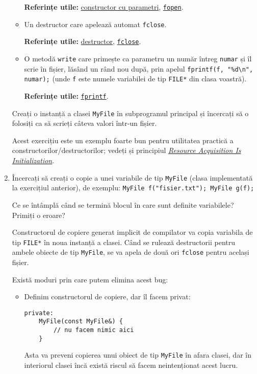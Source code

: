 \begin{enumerate}
\begin{itemize}
        \textbf{Referințe utile:} \href{https://en.cppreference.com/w/cpp/language/constructor}{constructor cu parametri}, \href{https://en.cppreference.com/w/cpp/io/c/fopen}{\texttt{fopen}}.

        \item Un destructor care apelează automat \texttt{fclose}.

        \textbf{Referințe utile:} \href{https://en.cppreference.com/w/cpp/language/destructor}{destructor}, \href{https://en.cppreference.com/w/cpp/io/c/fclose}{\texttt{fclose}}.

        \item O metodă \texttt{write} care primește ca parametru un număr întreg \texttt{numar} și îl scrie în fișier, lăsând un rând nou după, prin apelul \texttt{fprintf(f, "\%d\textbackslash{}n", numar);} (unde \texttt{f} este numele variabilei de tip \texttt{FILE*} din clasa voastră).

        \textbf{Referințe utile:} \href{https://en.cppreference.com/w/c/io/fprintf}{\texttt{fprintf}}.
    \end{itemize}

    Creați o instanță a clasei \texttt{MyFile} în subprogramul principal și încercați să o folosiți ca să scrieți câteva valori într-un fișier.

    Acest exercițiu este un exemplu foarte bun pentru utilitatea practică a constructorilor/destructorilor; vedeți și principiul \href{https://en.cppreference.com/w/cpp/language/raii}{\textit{Resource Acquisition Is Initialization}}.

    \item Încercați să creați o copie a unei variabile de tip \texttt{MyFile} (clasa implementată la exercițiul anterior), de exemplu: \texttt{MyFile f("fisier.txt"); MyFile g(f);}

    Ce se întâmplă când se termină blocul în care sunt definite variabilele? Primiți o eroare?
    
    Constructorul de copiere generat implicit de compilator va copia variabila de tip \texttt{FILE*} în noua instanță a clasei. Când se rulează destructorii pentru ambele obiecte de tip \texttt{MyFile}, se va apela de două ori \texttt{fclose} pentru același fișier.

    Există moduri prin care putem elimina acest bug:
    \begin{itemize}
        \item Definim constructorul de copiere, dar îl facem privat:
        \begin{lstlisting}
private:
    MyFile(const MyFile&) {
        // nu facem nimic aici
    }
        \end{lstlisting}
        Asta va preveni copierea unui obiect de tip \texttt{MyFile} în afara clasei, dar în interiorul clasei încă există riscul să facem neintenționat acest lucru.


\end{itemize}
\end{enumerate}
